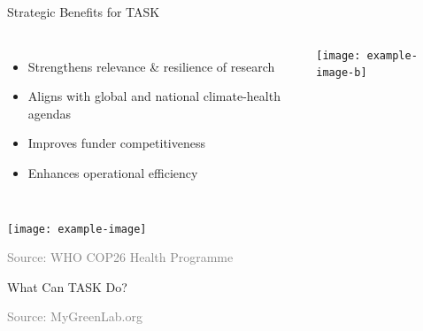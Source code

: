 \documentclass{beamer}
\newcommand{\source}[1]{\vspace{0.3cm}\hfill\scriptsize\textcolor{gray}{Source: #1}}
\begin{document}
\begin{frame}{Strategic Benefits for TASK}
\begin{columns}
\begin{itemize}[itemsep=1em]
    \item {} Strengthens relevance \& resilience of research
    \item {} Aligns with global and national climate-health agendas
    \item {} Improves funder competitiveness
    \item {} Enhances operational efficiency
\end{itemize}
\texttt{[image: example-image-b]} %
\end{columns}

\begin{flushright}
\texttt{[image: example-image]} %
\end{flushright}

\source{WHO COP26 Health Programme}
\end{frame}

\begin{frame}{What Can TASK Do?}
    
    \source{MyGreenLab.org}
\end{frame}
\end{document}
